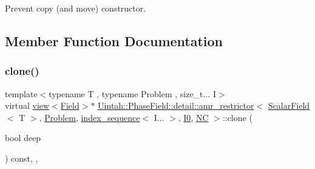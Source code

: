 Prevent copy (and move) constructor. 



\subsection{Member Function Documentation}
\mbox{\label{classUintah_1_1PhaseField_1_1detail_1_1amr__restrictor_3_01ScalarField_3_01T_01_4_00_01Problem_05760ee5d1d3adcc969b3f56f71e72acb_a7756f69a970700829f04886c454a4b18}} 
\subsubsection{\texorpdfstring{clone()}{clone()}\hspace{0.1cm}{\footnotesize\ttfamily [1/2]}}
{\footnotesize\ttfamily template$<$typename T , typename Problem , size\+\_\+t... I$>$ \\
virtual \hyperlink{classUintah_1_1PhaseField_1_1detail_1_1view}{view}$<$\hyperlink{structUintah_1_1PhaseField_1_1ScalarField}{Field}$>$$\ast$ \hyperlink{classUintah_1_1PhaseField_1_1detail_1_1amr__restrictor}{Uintah\+::\+Phase\+Field\+::detail\+::amr\+\_\+restrictor}$<$ \hyperlink{structUintah_1_1PhaseField_1_1ScalarField}{Scalar\+Field}$<$ T $>$, \hyperlink{classUintah_1_1PhaseField_1_1Problem}{Problem}, \hyperlink{namespaceUintah_1_1PhaseField_a237de804d99512e50613aff7c94a9461}{index\+\_\+sequence}$<$ I... $>$, \hyperlink{namespaceUintah_1_1PhaseField_a547ce3002aa97fbd3ef3192a6eec8406abdd8ebcbdfd71d1125937e3012dc45fb}{I0}, \hyperlink{namespaceUintah_1_1PhaseField_a33d355affda78a83f45755ba8388cedda77924170fe82bfd58b74ca3e44139718}{NC} $>$\+::clone (\begin{DoxyParamCaption}\item[{bool}]{deep }\end{DoxyParamCaption}) const\hspace{0.3cm}{\ttfamily [inline]}, {\ttfamily [override]}, {\ttfamily [virtual]}}



